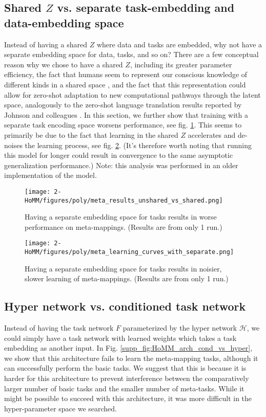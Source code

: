 \subsection{Shared $Z$ vs. separate task-embedding and data-embedding space} \label{app_lesion_results_shared_z}
Instead of having a shared $Z$ where data and tasks are embedded, why not have a separate embedding space for data, tasks, and so on? There are a few conceptual reason why we chose to have a shared $Z$, including its greater parameter efficiency, the fact that humans seem to represent our conscious knowledge of different kinds in a shared space \citep[][]{Baars2005}, and the fact that this representation could allow for zero-shot adaptation to new computational pathways through the latent space, analogously to the zero-shot language translation results reported by Johnson and colleagues \citep{Johnson2016a}. In this section, we further show that training with a separate task encoding space worsens performance, see fig. \ref{supp_lesion_shared_z_fig}. This seems to primarily be due to the fact that learning in the shared $Z$ accelerates and de-noises the learning process, see fig. \ref{supp_lesion_shared_z_learn_fig}. (It's therefore worth noting that running this model for longer could result in convergence to the same asymptotic generalization performance.) Note: this analysis was performed in an older implementation of the model. \par
\begin{figure}[H]
\centering
\texttt{[image: 2-HoMM/figures/poly/meta\_results\_unshared\_vs\_shared.png]}
\caption{Having a separate embedding space for tasks results in worse performance on meta-mappings. (Results are from only 1 run.)}
\label{supp_lesion_shared_z_fig}
\end{figure}

\begin{figure}[H]
\centering
\texttt{[image: 2-HoMM/figures/poly/meta\_learning\_curves\_with\_separate.png]}
\caption{Having a separate embedding space for tasks results in noisier, slower learning of meta-mappings. (Results are from only 1 run.)}
\label{supp_lesion_shared_z_learn_fig}
\end{figure}

\subsection{Hyper network vs. conditioned task network} \label{app_lesion_results_hyper}
Instead of having the task network $F$ parameterized by the hyper network $\mathcal{H}$, we could simply have a task network with learned weights which takes a task embedding as another input. In Fig. \ref{supp_fig:HoMM_arch_cond_vs_hyper}, we show that this architecture fails to learn the meta-mapping tasks, although it can successfully perform the basic tasks. We suggest that this is because it is harder for this architecture to prevent interference between the comparatively larger number of basic tasks and the smaller number of meta-tasks. While it might be possible to succeed with this architecture, it was more difficult in the hyper-parameter space we searched.\par 

